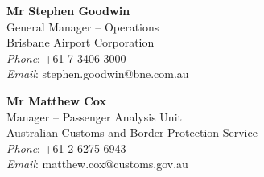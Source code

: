\documentclass[margin,line]{resume}
\begin{document}
\begin{resume}
{%
{\bf Mr Stephen Goodwin} \\
General Manager -- Operations \\
Brisbane Airport Corporation \\
{\it Phone}: +61 7 3406 3000    \\
{\it Email}: stephen.goodwin@bne.com.au

{\bf Mr Matthew Cox} \\
Manager -- Passenger Analysis Unit \\
Australian Customs and Border Protection Service \\
{\it Phone}: +61 2 6275 6943 \\
{\it Email}: matthew.cox@customs.gov.au



}


\end{resume}
\end{document}
